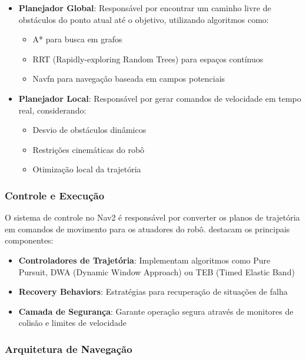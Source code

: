 \begin{itemize}
    \item \textbf{Planejador Global}: Responsável por encontrar um caminho livre de obstáculos do ponto atual até o objetivo, utilizando algoritmos como:
          \begin{itemize}
              \item A* para busca em grafos
              \item RRT (Rapidly-exploring Random Trees) para espaços contínuos
              \item Navfn para navegação baseada em campos potenciais
          \end{itemize}

    \item \textbf{Planejador Local}: Responsável por gerar comandos de velocidade em tempo real, considerando:
          \begin{itemize}
              \item Desvio de obstáculos dinâmicos
              \item Restrições cinemáticas do robô
              \item Otimização local da trajetória
          \end{itemize}
\end{itemize}

\subsubsection{Controle e Execução}

O sistema de controle no Nav2 é responsável por converter os planos de
trajetória em comandos de movimento para os atuadores do robô.
\cite{Stachowicz2023FastRLAP} destacam os principais componentes:

\begin{itemize}
    \item \textbf{Controladores de Trajetória}: Implementam algoritmos como Pure Pursuit, DWA (Dynamic Window Approach) ou TEB (Timed Elastic Band)
    \item \textbf{Recovery Behaviors}: Estratégias para recuperação de situações de falha
    \item \textbf{Camada de Segurança}: Garante operação segura através de monitores de colisão e limites de velocidade
\end{itemize}

\subsubsection{Arquitetura de Navegação}

